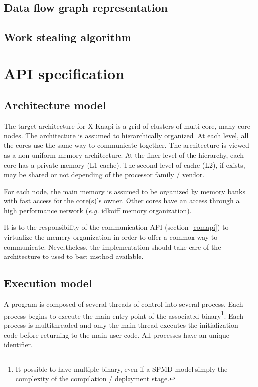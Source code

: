 \documentclass{report}
\begin{document}
\section{Data flow graph representation}

\section{Work stealing algorithm}

\newpage
\chapter{API specification}

\section{Architecture model}

The target architecture for X-Kaapi is a grid of clusters of multi-core, many core nodes.
The architecture is assumed to hierarchically organized. At each level, all the cores use the same way to communicate together. The architecture is viewed as a non uniform memory architecture.
At the finer level of the hierarchy, each core has a private memory (L1 cache). The second level of cache  (L2), if exists, may be shared or not depending of the processor family / vendor. 

For each node, the main memory is assumed to be organized by memory banks with fast access for the core(s)'s owner. Other cores have an access through a high performance network (\textit{e.g.} idkoiff memory organization).

It is to the responsibility of the communication API (section~\ref{comapi}) to virtualize the memory organization in order to offer a common way to communicate. Nevertheless, the implementation should take care of the architecture to used to best method available.

\section{Execution model}
A program is composed of several threads of control into several process. 
Each process begins to execute the main entry point of the associated binary\footnote{It possible to have multiple binary, even if a SPMD model simply the complexity of the compilation / deployment stage.}. Each process is multithreaded and only the main thread  executes the initialization code before returning to the main user code. All processes have an unique identifier.
\end{document}
